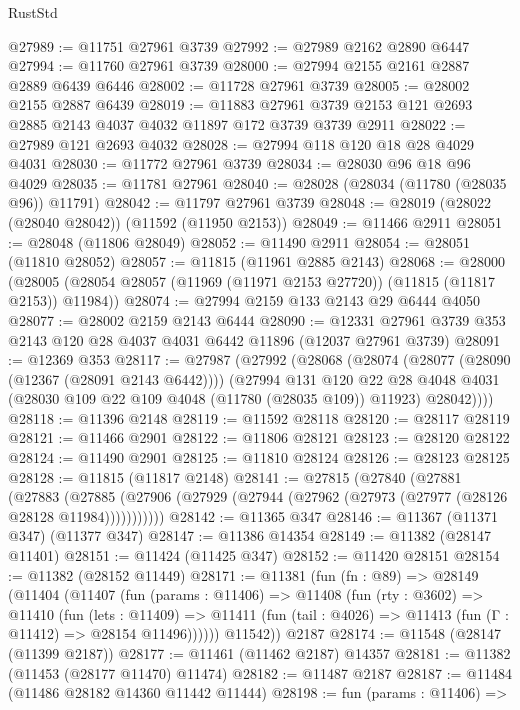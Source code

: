 \begin{lexlean}{RustStd}
\begin{coremodule}
@27989 := @11751 @27961 @3739
@27992 := @27989 @2162 @2890 @6447
@27994 := @11760 @27961 @3739
@28000 := @27994 @2155 @2161 @2887 @2889 @6439 @6446
@28002 := @11728 @27961 @3739
@28005 := @28002 @2155 @2887 @6439
@28019 := @11883 @27961 @3739 @2153 @121 @2693 @2885 @2143 @4037 @4032 @11897 @172 @3739 @3739 @2911
@28022 := @27989 @121 @2693 @4032
@28028 := @27994 @118 @120 @18 @28 @4029 @4031
@28030 := @11772 @27961 @3739
@28034 := @28030 @96 @18 @96 @4029
@28035 := @11781 @27961
@28040 := @28028 (@28034 (@11780 (@28035 @96)) @11791)
@28042 := @11797 @27961 @3739
@28048 := @28019 (@28022 (@28040 @28042)) (@11592 (@11950 @2153))
@28049 := @11466 @2911
@28051 := @28048 (@11806 @28049)
@28052 := @11490 @2911
@28054 := @28051 (@11810 @28052)
@28057 := @11815 (@11961 @2885 @2143)
@28068 := @28000
    (@28005 (@28054 @28057 (@11969 (@11971 @2153 @27720)) (@11815 (@11817 @2153)) @11984))
@28074 := @27994 @2159 @133 @2143 @29 @6444 @4050
@28077 := @28002 @2159 @2143 @6444
@28090 := @12331 @27961 @3739 @353 @2143 @120 @28 @4037 @4031 @6442 @11896 (@12037 @27961 @3739)
@28091 := @12369 @353
@28117 := @27987
    (@27992
      (@28068
        (@28074
          (@28077 (@28090 (@12367 (@28091 @2143 @6442))))
          (@27994
            @131
            @120
            @22
            @28
            @4048
            @4031
            (@28030 @109 @22 @109 @4048 (@11780 (@28035 @109)) @11923)
            @28042))))
@28118 := @11396 @2148
@28119 := @11592 @28118
@28120 := @28117 @28119
@28121 := @11466 @2901
@28122 := @11806 @28121
@28123 := @28120 @28122
@28124 := @11490 @2901
@28125 := @11810 @28124
@28126 := @28123 @28125
@28128 := @11815 (@11817 @2148)
@28141 := @27815
    (@27840
      (@27881
        (@27883
          (@27885 (@27906 (@27929 (@27944 (@27962 (@27973 (@27977 (@28126 @28128 @11984)))))))))))
@28142 := @11365 @347
@28146 := @11367 (@11371 @347) (@11377 @347)
@28147 := @11386 @14354
@28149 := @11382 (@28147 @11401)
@28151 := @11424 (@11425 @347)
@28152 := @11420 @28151
@28154 := @11382 (@28152 @11449)
@28171 := @11381
    (fun (fn : @89) =>
    @28149
      (@11404
        (@11407
          (fun (params : @11406) =>
          @11408
            (fun (rty : @3602) =>
            @11410
              (fun (lets : @11409) =>
              @11411 (fun (tail : @4026) => @11413 (fun (Γ : @11412) => @28154 @11496))))))
        @11542))
    @2187
@28174 := @11548 (@28147 (@11399 @2187))
@28177 := @11461 (@11462 @2187) @14357
@28181 := @11382 (@11453 (@28177 @11470) @11474)
@28182 := @11487 @2187
@28187 := @11484 (@11486 @28182 @14360 @11442 @11444)
@28198 := fun (params : @11406) =>

\end{coremodule}
\end{lexlean}
